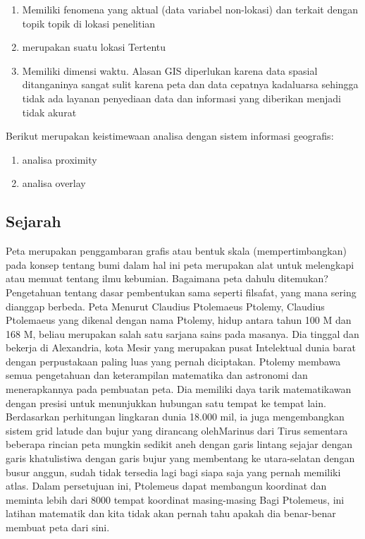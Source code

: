 \begin{enumerate}
\item Memiliki fenomena yang aktual (data variabel non-lokasi) dan terkait dengan topik topik di lokasi penelitian 
\item merupakan suatu lokasi Tertentu 
\item Memiliki dimensi waktu.  Alasan GIS diperlukan karena data spasial ditanganinya sangat sulit karena peta dan data cepatnya kadaluarsa sehingga tidak ada layanan penyediaan data dan informasi yang diberikan menjadi tidak akurat
\end{enumerate}
Berikut merupakan keistimewaan analisa dengan sistem informasi geografis:
\begin{enumerate}
\item analisa proximity
\item analisa overlay
\end{enumerate}
\subsection{Sejarah}
Peta merupakan penggambaran grafis atau bentuk skala (mempertimbangkan) pada konsep tentang bumi dalam hal ini peta merupakan alat untuk melengkapi atau memuat tentang ilmu kebumian.  Bagaimana peta dahulu ditemukan?  Pengetahuan tentang dasar pembentukan sama seperti filsafat, yang mana sering dianggap berbeda.  Peta Menurut Claudius Ptolemaeus Ptolemy, Claudius Ptolemaeus yang dikenal dengan nama Ptolemy, hidup antara tahun 100 M dan 168 M, beliau merupakan salah satu sarjana sains pada masanya.  Dia tinggal dan bekerja di Alexandria, kota Mesir yang merupakan pusat Intelektual dunia barat dengan perpustakaan paling luas yang pernah diciptakan.  Ptolemy membawa semua pengetahuan dan keterampilan matematika dan astronomi dan menerapkannya pada pembuatan peta.  Dia memiliki daya tarik matematikawan dengan presisi untuk menunjukkan hubungan satu tempat ke tempat lain.  Berdasarkan perhitungan lingkaran dunia 18.000 mil, ia juga mengembangkan sistem grid latude dan bujur yang dirancang olehMarinus dari Tirus sementara beberapa rincian peta mungkin sedikit aneh dengan garis lintang sejajar dengan garis khatulistiwa dengan garis bujur yang membentang ke utara-selatan dengan busur anggun, sudah tidak tersedia  lagi bagi siapa saja yang pernah memiliki atlas.  Dalam persetujuan ini, Ptolemeus dapat membangun koordinat dan meminta lebih dari 8000 tempat koordinat masing-masing Bagi Ptolemeus, ini latihan matematik dan kita tidak akan pernah tahu apakah dia benar-benar membuat peta dari sini.
